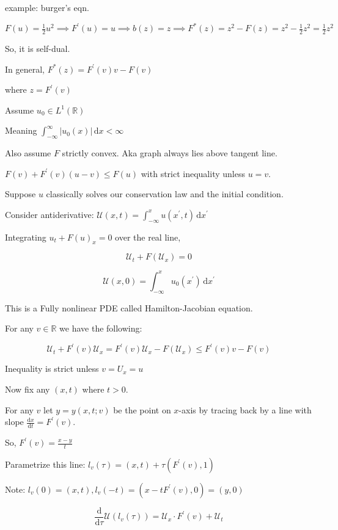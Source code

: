 \documentclass{article}
\theoremstyle{definition}
\begin{document}
example: burger's eqn.

\(F(u)=\frac{1}{2}u^2 \implies F^{\prime} (u)=u \implies b(z)=z \implies F^{\ast} (z) = z^2 - F(z)= z^2 - \frac{1}{2} z^2 = \frac{1}{2} z^2\) 

So, it is self-dual.

In general, \(F^{\ast} (z)=F^{\prime} (v)v - F(v)\)

where \(z = F^{\prime} (v)\)

Assume \(u_0 \in L^1(\mathbb{R})\)

Meaning \(\int_{-\infty}^{\infty} \vert u_0(x) \vert  \,\mathrm{d}x < \infty\) 

Also assume \(F\) strictly convex. Aka graph always lies above tangent line.

\(F(v)+F^{\prime} (v)(u-v) \leq F(u)\) with strict inequality unless \(u=v\). 

Suppose \(u\) classically solves our conservation law and the initial condition.

Consider antiderivative: \(\mathcal{U}(x,t) = \int_{-\infty}^{x} u(x^{\prime} , t) \,\mathrm{d}x^{\prime}  \) 

Integrating \(u_t + F(u)_x = 0\) over the real line,

\[
    \mathcal{U}_t + F(\mathcal{U}_x) = 0
\]

\[
    \mathcal{U}(x,0) = \int_{-\infty}^{x} u_0(x^{\prime}) \,\mathrm{d}x^{\prime}  
\]

This is a Fully nonlinear PDE called Hamilton-Jacobian equation.

For any \(v\in\mathbb{R}\) we have the following:

\[
    \mathcal{U}_t + F^{\prime} (v) \mathcal{U}_x = F^{\prime} (v) \mathcal{U}_x - F(\mathcal{U}_x) \leq F^{\prime}(v) v - F(v)
\]

Inequality is strict unless \(v = U_x = u\) 

Now fix any \((x,t)\) where \(t > 0\).

For any \(v\) let \(y = y(x,t ; v)\) be the point on \(x\)-axis by tracing back by a line with slope \(\frac{\mathrm{d}x}{\mathrm{d}t} = F^{\prime}(v)\).

So, \(F^{\prime} (v) = \frac{x-y}{t}\) 

Parametrize this line: \(l_v(\tau) = (x,t)+\tau(F^{\prime} (v),1)\)

Note: \(l_v(0)=(x,t), l_v(-t)=(x-t F^{\prime} (v), 0)=(y,0)\)

\[
    \frac{\mathrm{d}}{\mathrm{d}\tau} \mathcal{U}(l_v(\tau)) = \mathcal{U}_x \cdot F^{\prime} (v) + \mathcal{U}_t
\]
\end{document}
